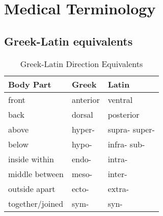\documentclass[../../EMT-169.tex]{subfiles}
\begin{document}
\setcounter{chapter}{4}
\label{ch:chapter5}
\clearpage

	

\chapter{Medical Terminology}



\section{Greek-Latin equivalents}


\begin{table}[ht]
	\centering
	\caption{Greek-Latin Direction Equivalents}
	\begin{tabular}{|p{3.5cm}|P{4cm}|P{4cm}|}
		\hline
		\textbf{Body Part}	& \textbf{Greek}	& \textbf{Latin}	\\ \hline
		\hline
		front         		& anterior			& ventral     		\\ \hline
		back       			& dorsal	   		& posterior 		\\ \hline
		\hline
		above				& hyper-			& supra- 
												  super-			\\ \hline
		below				& hypo-				& infra- 		
												  sub-				\\ \hline
		\hline
		inside 	
		within				& endo-				& intra- 			\\ \hline
		middle						
		between				& meso-				& inter- 			\\ \hline
		outside						
		apart				& ecto-				& extra- 			\\ \hline
		\hline
		together/joined 	& sym-     			& syn-	    		\\ \hline
	\end{tabular}
\end{table}
\end{document}
